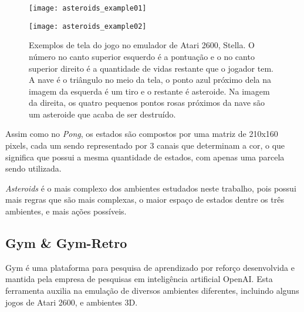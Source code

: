 \begin{figure}[h!]
  \begin{minipage}[b]{.5\textwidth}
  \centering
  \texttt{[image: asteroids\_example01]}
  \end{minipage}
  \hfill
  \begin{minipage}[b]{.5\textwidth}
  \texttt{[image: asteroids\_example02]}
  \end{minipage}
  \caption{Exemplos de tela do jogo no emulador de Atari 2600, Stella. O número no canto superior esquerdo é a pontuação e o no canto superior direito é a quantidade de vidas restante que o jogador tem. A nave é o triângulo no meio da tela, o ponto azul próximo dela na imagem da esquerda é um tiro e o restante é asteroide. Na imagem da direita, os quatro pequenos pontos rosas próximos da nave são um asteroide que acaba de ser destruído.}
\end{figure}

Assim como no \textit{Pong}, os estados são compostos por uma matriz de 210x160 pixels, cada um sendo representado por 3 canais que determinam a cor, o que significa que possui a mesma quantidade de estados, com apenas uma parcela sendo utilizada.

\textit{Asteroids} é o mais complexo dos ambientes estudados neste trabalho, pois possui mais regras que são mais complexas, o maior espaço de estados dentre os três ambientes, e mais ações possíveis. 


\subsection{Gym \& Gym-Retro}
\label{sec:gymretro}

Gym é uma plataforma para pesquisa de aprendizado por reforço desenvolvida e mantida pela empresa de pesquisas em inteligência artificial OpenAI.
Esta ferramenta auxilia na emulação de diversos ambientes diferentes, incluindo alguns jogos de Atari 2600, e ambientes 3D.

